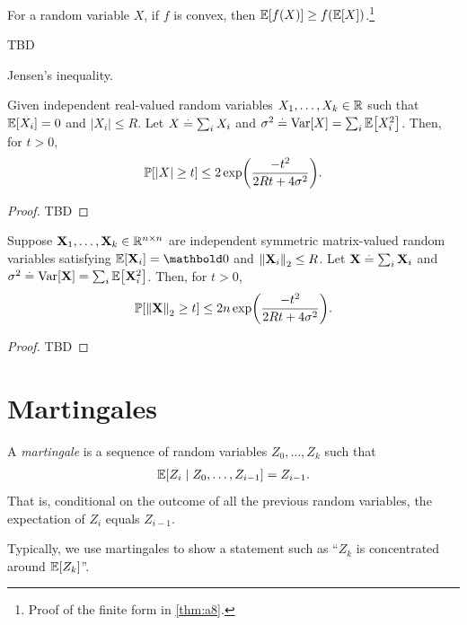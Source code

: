\begin{thm}
For a random variable $X$, if $f$ is convex, then $\E{f(X)} \geq f(\E{X})$.\footnote{Proof of the finite form in \cref{thm:a8}.}
\end{thm}
\begin{marginfigure}
TBD
\caption{Jensen's inequality.}
\end{marginfigure}

\begin{thm} Given independent real-valued random variables $X_1, \dots, X_k \in \mathbb{R}$ such that $\E{X_i} = 0$ and $|X_i| \leq R$. Let $X \overset{.}{=} \sum_i X_i$ and $\sigma^2 \defeq \Var{X} = \sum_i \E{X_i^2}$. Then, for $t > 0$, \begin{align}
    \Pr{|X| \geq t} \leq 2 \exp\parentheses*{\frac{-t^2}{2Rt + 4\sigma^2}}.
\end{align}
\end{thm}
\begin{proof}
TBD
\end{proof}

\begin{thm} Suppose $\mathbf{X}_1, \dots, \mathbf{X}_k \in \mathbb{R}^{n \times n}$ are independent symmetric matrix-valued random variables satisfying $\E{\rX_i} = \mZero$ and $\left\| \mathbf{X}_i \right\|_2 \leq R$. Let $\mathbf{X} \overset{.}{=} \sum_i \mathbf{X}_i$ and $\sigma^2 \defeq \Var{\rX} = \sum_i \E{\rX_i^2}$. Then, for $t > 0$, \begin{align}
    \Pr{\norm{\rX}_2 \geq t} \leq 2 n \exp\parentheses*{\frac{-t^2}{2Rt + 4\sigma^2}}.
\end{align}
\end{thm}
\begin{proof}
TBD
\end{proof}

\section{Martingales}

\begin{defn}[Martingale] A \emph{martingale} is a sequence of random variables $Z_0, \dots, Z_k$ such that \begin{align}
    \E{Z_i \mid Z_0, \dots, Z_{i-1}} = Z_{i-1}.
\end{align} That is, conditional on the outcome of all the previous random variables, the expectation of $Z_i$ equals $Z_{i-1}$.%
\end{defn} Typically, we use martingales to show a statement such as ``$Z_k$ is concentrated around $\E{Z_k}$''.

